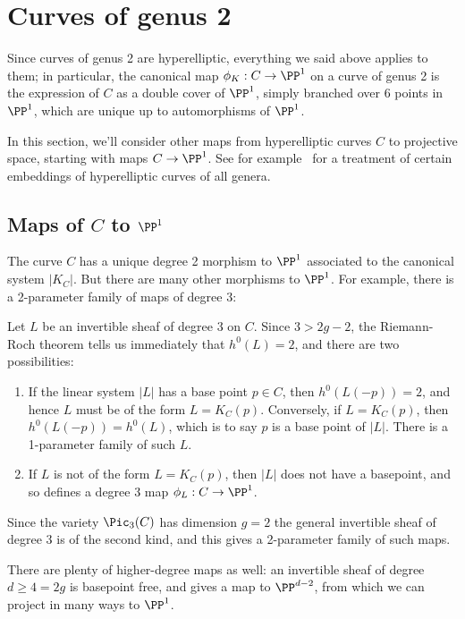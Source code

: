 \section{Curves of genus 2}\label{genus 2 section}

Since  curves of genus 2 are hyperelliptic, everything we said above applies to them; in particular, the canonical map $\phi_K : C \to \PP^1$ on a curve of genus 2 is the expression of $C$ as a double cover of $\PP^1$, simply branched over 6 points in $\PP^1$, which are unique up to automorphisms of $\PP^1$. 

In this section, we'll consider other maps from hyperelliptic curves $C$ to projective space, starting with maps $C \to \PP^1$.
See for example~\cite{transcanonical} for a treatment of certain embeddings of hyperelliptic curves of all genera.

\subsection{Maps of $C$ to $\PP^1$}\label{genus 2 pencil}

The curve $C$ has a unique degree 2 morphism to $\PP^1$  associated to the canonical system $|K_C|$. But there are many other morphisms to $\PP^1$. For example, there is a 2-parameter
family of maps of degree 3:

 Let $L$ be an invertible sheaf of degree 3 on $C$. Since $3 > 2g-2$, the Riemann-Roch theorem tells us immediately that $h^0(L) = 2$, and there are two possibilities:

\begin{enumerate}
\item If the linear system $|L|$ has a base point $p \in C$, then $h^0(L(-p)) = 2$, and hence $L$ must be of the form $L = K_C(p)$. Conversely, if $L = K_C(p)$, then $h^0(L(-p)) = h^0(L)$, which is to say $p$ is a base point of $|L|$. There is a 1-parameter family of such $L$.

\item If $L$ is not of the form $L = K_C(p)$, then $|L|$ does not have a basepoint, and so defines a degree 3 map $\phi_L : C \to \PP^1$.
\end{enumerate}

Since the variety $\Pic_3(C)$ has dimension $g= 2$ the general invertible sheaf of degree 3 is of the second kind, and this gives a 2-parameter family of such maps.

There are plenty of higher-degree maps as well: an invertible sheaf of degree $d \geq 4 = 2g$ is basepoint free, and gives a map to $\PP^{d-2}$, from which we can project in many ways
to $\PP^1$.

